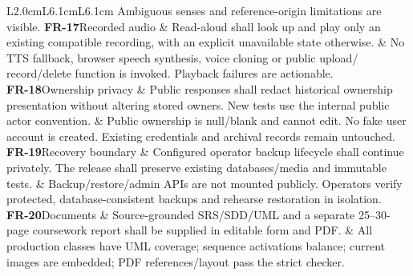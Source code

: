 \documentclass[11pt]{article}
\newcommand{\req}[4]{\textbf{#1}\newline #2 & #3 & #4\\\addlinespace}
\begin{document}
\begin{longtable}{L{2.0cm}L{6.1cm}L{6.1cm}}
{Ambiguous senses and reference-origin limitations are visible.}
\req{FR-17}{Recorded audio}
{Read-aloud shall look up and play only an existing compatible recording,
with an explicit unavailable state otherwise.}
{No TTS fallback, browser speech synthesis, voice cloning or public upload/
record/delete function is invoked. Playback failures are actionable.}
\req{FR-18}{Ownership privacy}
{Public responses shall redact historical ownership presentation without
altering stored owners. New tests use the internal public actor convention.}
{Public ownership is null/blank and cannot edit. No fake user account is
created. Existing credentials and archival records remain untouched.}
\req{FR-19}{Recovery boundary}
{Configured operator backup lifecycle shall continue privately. The release
shall preserve existing databases/media and immutable tests.}
{Backup/restore/admin APIs are not mounted publicly. Operators verify protected,
database-consistent backups and rehearse restoration in isolation.}
\req{FR-20}{Documents}
{Source-grounded SRS/SDD/UML and a separate 25--30-page coursework report
shall be supplied in editable form and PDF.}
{All production classes have UML coverage; sequence activations balance;
current images are embedded; PDF references/layout pass the strict checker.}
\bottomrule
\end{longtable}
\end{document}
